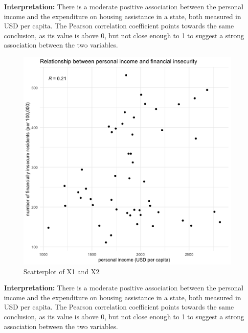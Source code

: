 \documentclass[12pt,letterpaper]{article}
\begin{document}
\textbf{Interpretation:} There is a moderate positive association between the personal income and the expenditure on housing assistance in a state, both measured in USD per capita. The Pearson correlation coefficient points towards the same conclusion, as its value is above 0, but not close enough to 1 to suggest a strong association between the two variables. 
\newpage
\begin{figure}[h!]\centering
	\caption{\footnotesize Scatterplot of X1 and X2}
	\label{fig:plot_4}
	\includegraphics[width=.95\textwidth]{scatter_x1_x2.png}
\end{figure}
\textbf{Interpretation:} There is a moderate positive association between the personal income and the expenditure on housing assistance in a state, both measured in USD per capita. The Pearson correlation coefficient points towards the same conclusion, as its value is above 0, but not close enough to 1 to suggest a strong association between the two variables. 
\newpage
\end{document}
